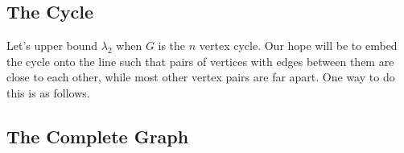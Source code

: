 
\subsection{The Cycle}

Let's upper bound $\lambda_2$ when $G$ is the $n$ vertex cycle. Our hope will be to embed the cycle onto the line such that pairs of vertices with edges between them are close to each other, while most other vertex pairs are far apart. One way to do this is as follows.





\subsection{The Complete Graph}
